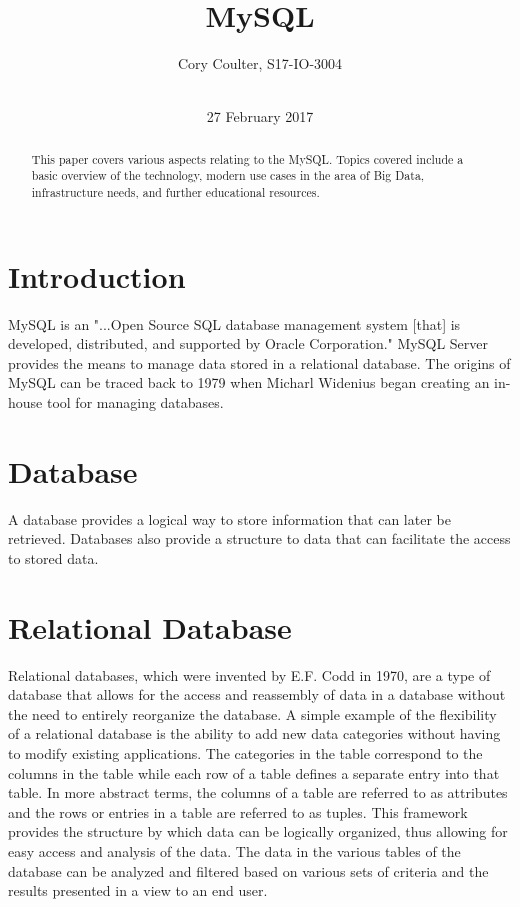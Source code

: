 \documentclass{acm_proc_article-sp}
\begin{document}
\title{MySQL}

\author{
\alignauthor
Cory Coulter, S17-IO-3004\\
       \\
}

\date{27 February 2017}


\maketitle
\begin{abstract}
This paper covers various aspects relating to the MySQL. Topics
covered include a basic overview of the technology, modern use cases
in the area of Big Data, infrastructure needs, and further educational
resources.
\end{abstract}


\section{Introduction}
MySQL is an "...Open Source SQL database management system [that] is
developed, distributed, and supported by Oracle Corporation."
\cite{devmysql} MySQL Server provides the means to manage data stored
in a relational database. \cite{devmysql} The origins of MySQL can be
traced back to 1979 when Micharl Widenius began creating an in-house
tool for managing databases. \cite{mik}

\section{Database}
A database provides a logical way to store information that can later
be retrieved. \cite{mysqlbible} Databases also provide a structure to
data that can facilitate the access to stored data.

\section{Relational Database}
Relational databases, which were invented by E.F. Codd in 1970, are a
type of database that allows for the access and reassembly of data in
a database without the need to entirely reorganize the
database. \cite{searchsql} A simple example of the flexibility of a
relational database is the ability to add new data categories without
having to modify existing applications. \cite{searchsql} The
categories in the table correspond to the columns in the table while
each row of a table defines a separate entry into that
table. \cite{ibm} In more abstract terms, the columns of a table are
referred to as attributes and the rows or entries in a table are
referred to as tuples. This framework provides the structure by which
data can be logically organized, thus allowing for easy access and
analysis of the data. The data in the various tables of the database
can be analyzed and filtered based on various sets of criteria and the
results presented in a view to an end user. \cite{searchsql}
\end{document}

